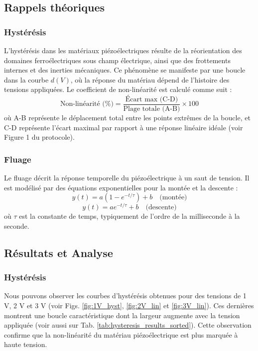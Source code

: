 \subsection{Rappels théoriques}

\subsubsection{Hystérésis}
L'hystérésis dans les matériaux piézoélectriques résulte de la réorientation des domaines ferroélectriques sous champ électrique, ainsi que des frottements internes et des inerties mécaniques. Ce phénomène se manifeste par une boucle dans la courbe $d(V)$, où la réponse du matériau dépend de l’histoire des tensions appliquées. Le coefficient de non-linéarité est calculé comme suit :
\begin{equation}
    \text{Non-linéarité (\%)} = \frac{\text{Écart max (C-D)}}{\text{Plage totale (A-B)}} \times 100
    \label{eq:eq_lin}
\end{equation}
où A-B représente le déplacement total entre les points extrêmes de la boucle, et C-D représente l’écart maximal par rapport à une réponse linéaire idéale (voir Figure 1 du protocole).

\subsubsection{Fluage}
Le fluage décrit la réponse temporelle du piézoélectrique à un saut de tension. Il est modélisé par des équations exponentielles pour la montée et la descente :
\begin{equation}
    y(t) = a \left(1 - e^{-t/\tau}\right) + b \quad \text{(montée)}
    \label{eq:t_m}
\end{equation}
\begin{equation}
    y(t) = a e^{-t/\tau} + b \quad \text{(descente)}
    \label{eq:t_d}
\end{equation}
où $\tau$ est la constante de temps, typiquement de l’ordre de la milliseconde à la seconde.

\subsection{Résultats et Analyse}

\subsubsection{Hystérésis}
Nous pouvons observer les courbes d’hystérésis obtenues pour des tensions de 1 V, 2 V et 3 V (voir Figs. \ref{fig:1V_hyst}, \ref{fig:2V_lin} et \ref{fig:3V_lin}). Ces dernières montrent une boucle caractéristique dont la largeur augmente avec la tension appliquée (voir aussi sur Tab. \ref{tab:hysteresis_results_sorted}). Cette observation confirme que la non-linéarité du matériau piézoélectrique est plus marquée à haute tension.

